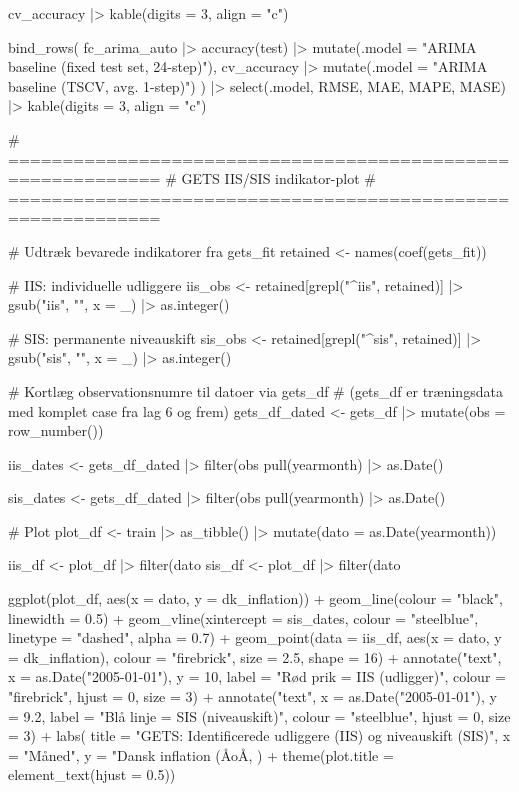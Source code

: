 cv_accuracy |> kable(digits = 3, align = "c")

bind_rows(
  fc_arima_auto |> accuracy(test) |>
    mutate(.model = "ARIMA baseline (fixed test set, 24-step)"),
  cv_accuracy |>
    mutate(.model = "ARIMA baseline (TSCV, avg. 1-step)")
) |>
  select(.model, RMSE, MAE, MAPE, MASE) |>
  kable(digits = 3, align = "c")

# ============================================================
# GETS IIS/SIS indikator-plot
# ============================================================

# Udtræk bevarede indikatorer fra gets_fit
retained <- names(coef(gets_fit))

# IIS: individuelle udliggere
iis_obs <- retained[grepl("^iis", retained)] |>
  gsub("iis", "", x = _) |>
  as.integer()

# SIS: permanente niveauskift
sis_obs <- retained[grepl("^sis", retained)] |>
  gsub("sis", "", x = _) |>
  as.integer()

# Kortlæg observationsnumre til datoer via gets_df
# (gets_df er træningsdata med komplet case fra lag 6 og frem)
gets_df_dated <- gets_df |>
  mutate(obs = row_number())

iis_dates <- gets_df_dated |>
  filter(obs %
  pull(yearmonth) |>
  as.Date()

sis_dates <- gets_df_dated |>
  filter(obs %
  pull(yearmonth) |>
  as.Date()

# Plot
plot_df <- train |>
  as_tibble() |>
  mutate(dato = as.Date(yearmonth))

iis_df <- plot_df |> filter(dato %
sis_df <- plot_df |> filter(dato %

ggplot(plot_df, aes(x = dato, y = dk_inflation)) +
  geom_line(colour = "black", linewidth = 0.5) +
  geom_vline(xintercept = sis_dates,
             colour = "steelblue", linetype = "dashed", alpha = 0.7) +
  geom_point(data = iis_df, aes(x = dato, y = dk_inflation),
             colour = "firebrick", size = 2.5, shape = 16) +
  annotate("text", x = as.Date("2005-01-01"), y = 10,
           label = "Rød prik = IIS (udligger)", colour = "firebrick",
           hjust = 0, size = 3) +
  annotate("text", x = as.Date("2005-01-01"), y = 9.2,
           label = "Blå linje = SIS (niveauskift)", colour = "steelblue",
           hjust = 0, size = 3) +
  labs(
    title = "GETS: Identificerede udliggere (IIS) og niveauskift (SIS)",
    x     = "Måned",
    y     = "Dansk inflation (ÅoÅ, %
  ) +
  theme(plot.title = element_text(hjust = 0.5))

